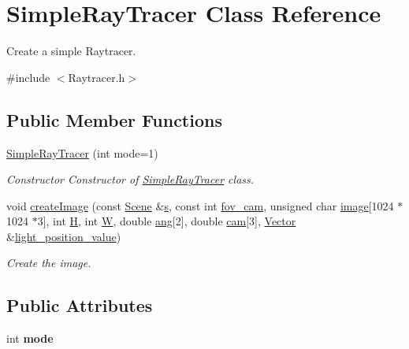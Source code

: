 \hypertarget{classSimpleRayTracer}{}\section{Simple\+Ray\+Tracer Class Reference}
\label{classSimpleRayTracer}


Create a simple Raytracer.  




{\ttfamily \#include $<$Raytracer.\+h$>$}

\subsection*{Public Member Functions}
\begin{DoxyCompactItemize}
\item 
\hyperlink{classSimpleRayTracer_aec30e74e21fea028c25a37fc5d9278d2}{Simple\+Ray\+Tracer} (int mode=1)
\begin{DoxyCompactList}\small\item\em Constructor Constructor of \hyperlink{classSimpleRayTracer}{Simple\+Ray\+Tracer} class. \end{DoxyCompactList}\item 
void \hyperlink{classSimpleRayTracer_ac47615738da770c6799d018a95e8cffd}{create\+Image} (const \hyperlink{classScene}{Scene} \&\hyperlink{Main_8cpp_aecc1396fc611f6e71d5d70228e7b089a}{s}, const int \hyperlink{Main_8cpp_afac324b61ac0563c734fcdb81d98e344}{fov\+\_\+cam}, unsigned char \hyperlink{Main_8cpp_a92ebae258b9cd4407b2510c3d18633ee}{image}\mbox{[}1024 $\ast$1024 $\ast$3\mbox{]}, int \hyperlink{Main_8cpp_affa487e8e3cc48473cfc05c0ce0165e9}{H}, int \hyperlink{Main_8cpp_a2dd51e03005d5cb52315290d27f61870}{W}, double \hyperlink{Main_8cpp_a861ee06bf1e430650b4437260a119635}{ang}\mbox{[}2\mbox{]}, double \hyperlink{Main_8cpp_a9fe883a18727d129289b149e5f0305eb}{cam}\mbox{[}3\mbox{]}, \hyperlink{classVector}{Vector} \&\hyperlink{Main_8cpp_a7e3f38517518eb6f7e4744b4fe12fcd2}{light\+\_\+position\+\_\+value})
\begin{DoxyCompactList}\small\item\em Create the image. \end{DoxyCompactList}\end{DoxyCompactItemize}
\subsection*{Public Attributes}
\begin{DoxyCompactItemize}
\item 
\mbox{\label{classSimpleRayTracer_ab2d25b3a9492313cddebc55af8ffae15}} 
int {\bfseries mode}
\end{DoxyCompactItemize}


